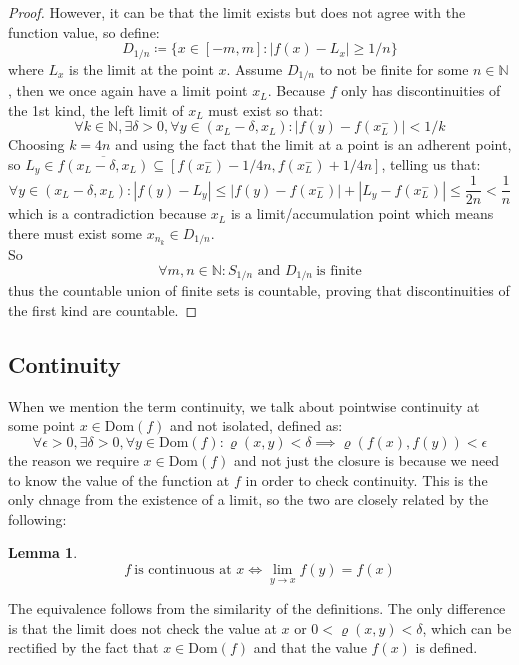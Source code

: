 \documentclass[10pt,letterpaper]{article} %
\newtheorem{lem}{Lemma}[section]
\begin{document}
\begin{proof}
However, it can be that the limit exists but does not agree with the function value, so define:
\begin{equation*}
D_{1/n} \coloneq \{x \in [-m, m] : |f(x) - L_x| \geqslant 1/n\}
\end{equation*}
where $L_x$ is the limit at the point $x$. Assume $D_{1/n}$ to not be finite for some $n \in \mathbb{N}$, then we once again have a limit point $x_L$. Because $f$ only has discontinuities of the 1st kind, the left limit of $x_L$ must exist so that:
\begin{equation*}
\forall k \in \mathbb{N}, \exists \delta > 0, \forall y \in (x_L - \delta, x_L): |f(y) - f(x_L^-)| < 1/k
\end{equation*}
Choosing $k = 4n$ and using the fact that the limit at a point is an adherent point, so $L_y \in \overline{f(x_L - \delta, x_L)} \subseteq [f(x_L^-) - 1/4n, f(x_L^-) + 1/4n]$, telling us that:
\begin{equation*}
\forall y \in (x_L - \delta, x_L): |f(y) - L_y| \leqslant |f(y) - f(x_L^-)| + |L_y - f(x_L^-)| \leqslant \frac{1}{2n} < \frac{1}{n}
\end{equation*}
which is a contradiction because $x_L$ is a limit/accumulation point which means there must exist some $x_{n_k} \in D_{1/n}$. \\

So
\begin{equation*}
\forall m, n \in \mathbb{N}: S_{1/n} \text{ and } D_{1/n} \  \text{is finite}
\end{equation*}
thus the countable union of finite sets is countable, proving that discontinuities of the first kind are countable. 
\end{proof}

\subsection{Continuity}
When we mention the term continuity, we talk about pointwise continuity at some point $x \in \text{Dom}(f)$ and not isolated, defined as:
\begin{equation*}
\forall \epsilon > 0, \exists \delta > 0, \forall y \in \text{Dom}(f): \varrho(x, y) < \delta \implies \varrho(f(x), f(y)) < \epsilon
\end{equation*}
the reason we require $x \in \text{Dom}(f)$ and not just the closure is because we need to know the value of the function at $f$ in order to check continuity. This is the only chnage from the existence of a limit, so the two are closely related by the following:
\begin{lem}
\begin{equation*}
f \ \text{is continuous at } x \iff \lim_{y \xrightarrow{} x} f(y) = f(x)
\end{equation*}
\end{lem}
The equivalence follows from the similarity of the definitions. The only difference is that the limit does not check the value at $x$ or $0 < \varrho(x, y) < \delta$, which can be rectified by the fact that $x \in \text{Dom}(f)$ and that the value $f(x)$ is defined.\\
\end{document}
